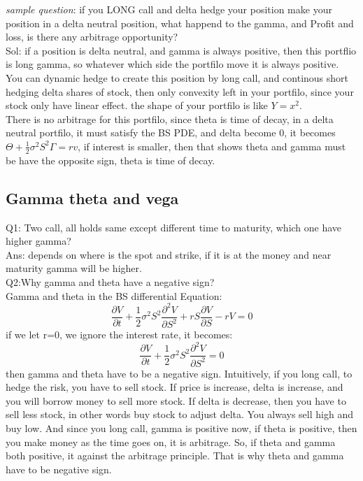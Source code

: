 \documentclass[a4paper,11pt]{article}
\begin{document}
{\em sample question}: if you LONG call and delta hedge your position make your position in a delta neutral position, what happend to the gamma, and Profit and loss, is there any arbitrage opportunity?\\
Sol: if a position is delta neutral, and gamma is always positive, then this portflio is long gamma, so whatever which side the portfilo move it is always positive. You can dynamic hedge to create this position by long call, and continous short hedging delta shares of stock, then only convexity left in your portfilo, since your stock only have linear effect. the shape of your portfilo is like $Y=x^2$.\\
There is no arbitrage for this portfilo, since theta is time of decay, in a delta neutral portfilo, it must satisfy the BS PDE, and delta become 0, it becomes $\Theta+\frac{1}{2}\sigma^2S^2\Gamma=rv$, if interest is smaller, then that shows theta and gamma must be have the opposite sign, theta is time of decay.
\subsection{Gamma theta and vega}
Q1: Two call, all holds same except different time to maturity, which one have higher gamma?\\
Ans: depends on where is the spot and strike, if it is at the money and near maturity gamma will be higher.\\
Q2:Why gamma and theta have a negative sign?\\
Gamma and theta in the BS differential Equation:\\
$$
\frac{\partial V}{\partial t} + \frac{1}{2}\sigma^2 S^2 \frac{\partial^2 V}{\partial S^2} + rS\frac{\partial V}{\partial S} - rV = 0
$$
if we let r=0, we ignore the interest rate, it becomes:\\
$$
\frac{\partial V}{\partial t} + \frac{1}{2}\sigma^2 S^2 \frac{\partial^2 V}{\partial S^2}  = 0
$$
then gamma and theta have to be a negative sign. Intuitively, if you long call, to hedge the risk, you have to sell stock. If price is increase, delta is increase, and you will borrow money to sell more stock. If delta is decrease, then you have to sell less stock, in other words buy stock to adjust delta. You always sell high and buy low. And since you long call, gamma is positive now, if theta is positive, then you make money as the time goes on, it is arbitrage. So, if theta and gamma both positive, it against the arbitrage principle. That is why theta and gamma have to be negative sign.\\
\end{document}

